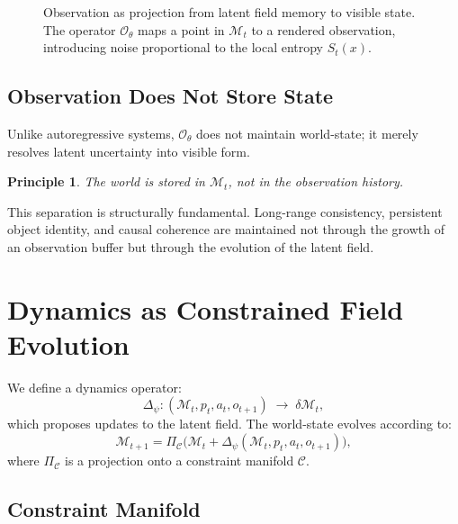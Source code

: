 \documentclass[11pt]{article}
\newtheorem{principle}{Principle}
\begin{document}
\begin{figure}[h]
\centering
{}
\caption{Observation as projection from latent field memory to visible
state. The operator $\mathcal{O}_\theta$ maps a point in $\mathcal{M}_t$
to a rendered observation, introducing noise proportional to the local
entropy $S_t(x)$.}
\end{figure}

\subsection{Observation Does Not Store State}

Unlike autoregressive systems, $\mathcal{O}_\theta$ does not maintain
world-state; it merely resolves latent uncertainty into visible form.

\begin{principle}
The world is stored in $\mathcal{M}_t$, not in the observation history.
\end{principle}

This separation is structurally fundamental.
Long-range consistency, persistent object identity, and causal coherence
are maintained not through the growth of an observation buffer but through
the evolution of the latent field.

\section{Dynamics as Constrained Field Evolution}

We define a dynamics operator:
\[
\Delta_\psi :
(\mathcal{M}_t, p_t, a_t, o_{t+1})
\;\longrightarrow\;
\delta \mathcal{M}_t,
\]
which proposes updates to the latent field.
The world-state evolves according to:
\[
\mathcal{M}_{t+1}
=
\Pi_{\mathcal{C}}
\big(
\mathcal{M}_t + \Delta_\psi(\mathcal{M}_t,p_t,a_t,o_{t+1})
\big),
\]
where $\Pi_{\mathcal{C}}$ is a projection onto a constraint manifold
$\mathcal{C}$.

\subsection{Constraint Manifold}
\end{document}
